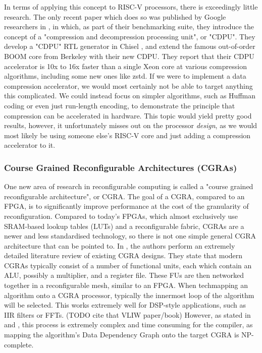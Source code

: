 \documentclass[12pt]{article}
\begin{document}
In terms of applying this concept to RISC-V processors, there is exceedingly little research. The only recent
paper which does so was published by Google researchers in \cite{Karandikar2023}, in which, as part of their
benchmarking suite, they introduce the concept of a "compression and decompression processing unit", or "CDPU".
They develop a "CDPU" RTL generator in Chisel \cite{Chisel}, and extend the famous out-of-order BOOM core
\cite{Asanovi2015TheBO} from Berkeley with their new CDPU. They report that their CDPU accelerator is 10x
to 16x faster than a single Xeon core at various compression algorithms, including some new ones like zstd.
If we were to implement a data compression accelerator, we would most certainly not be able to target anything
this complicated. We could instead focus on simpler algorithms, such as Huffman coding or even just
run-length encoding, to demonstrate the principle that compression can be accelerated in hardware. This topic
would yield pretty good results, however, it unfortunately misses out on the processor \textit{design}, as we
would most likely be using someone else's RISC-V core and just adding a compression accelerator to it.

\subsubsection{Course Grained Reconfigurable Architectures (CGRAs)}

One new area of research in reconfigurable computing is called a "course grained reconfigurable architecture", or
CGRA. The goal of a CGRA, compared to an FPGA, is to significantly improve performance at the cost of the
granularity of reconfiguration. Compared to today's FPGAs, which almost exclusively use SRAM-based lookup tables
(LUTs) and a reconfigurable fabric, CGRAs are a newer and less standardised technology, so there is not one
simple general CGRA architecture that can be pointed to. In \cite{Podobas2020}, the authors perform an
extremely detailed literature review of existing CGRA designs. They state that modern CGRAs typically consist
of a number of functional units, each which contain an ALU, possibly a multiplier, and a register file. These
FUs are then networked together in a reconfigurable mesh, similar to an FPGA. When techmapping an algorithm 
onto a CGRA processor, typically the innermost loop of the algorithm will be selected. This works extremely 
well for DSP-style applications, such as IIR filters or FFTs. (TODO cite that VLIW paper/book)
However, as stated in \cite{asuCoarseGrainedReconfigurable} and \cite{umichCCCPCoarseGrained}, this process is
extremely complex and time consuming for the compiler, as mapping the algorithm's Data Dependency Graph onto
the target CGRA is NP-complete.
\end{document}
